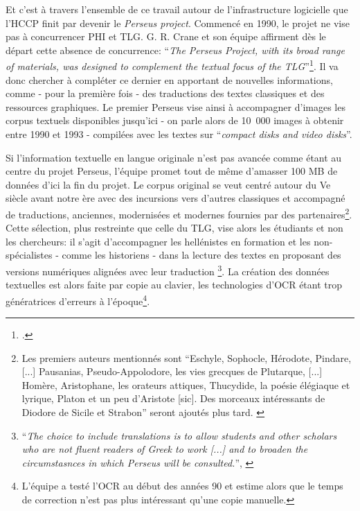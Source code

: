 Et c'est à travers l'ensemble de ce travail autour de l'infrastructure logicielle que l'HCCP finit par devenir le \textit{Perseus project}. Commencé en 1990, le projet ne vise pas à concurrencer PHI et TLG. G. R. Crane et son équipe affirment dès le départ cette absence de concurrence: \enquote{\textit{The Perseus Project, with its broad range of materials, was designed to complement the textual focus of the TLG}}\footcite[p. 134]{mylonas_perseus_1993}. Il va donc chercher à compléter ce dernier en apportant de nouvelles informations, comme - pour la première fois - des traductions des textes classiques et des ressources graphiques. Le premier Perseus vise ainsi à accompagner d'images les corpus textuels disponibles jusqu'ici - on parle alors de 10~000 images à obtenir entre 1990 et 1993 - compilées avec les textes sur \enquote{\textit{compact disks and video disks}}.

Si l'information textuelle en langue originale n'est pas avancée comme étant au centre du projet Perseus, l'équipe promet tout de même d'amasser 100 MB de données d'ici la fin du projet. Le corpus original se veut centré autour du Ve siècle avant notre ère avec des incursions vers d'autres classiques et accompagné de traductions, anciennes, modernisées et modernes fournies par des partenaires\footnote{Les premiers auteurs mentionnés sont \enquote{Eschyle, Sophocle, Hérodote, Pindare, {[...]} Pausanias, Pseudo-Appolodore, les vies grecques de Plutarque, {[...]} Homère, Aristophane, les orateurs attiques, Thucydide, la poésie élégiaque et lyrique, Platon et un peu d'Aristote {[sic]}. Des morceaux intéressants de Diodore de Sicile et Strabon} seront ajoutés plus tard. \cite{mylonas_perseus_1993}}. Cette sélection, plus restreinte que celle du TLG, vise alors les étudiants et non les chercheurs: il s'agit d'accompagner les hellénistes en formation et les non-spécialistes - comme les historiens - dans la lecture des textes en proposant des versions numériques alignées avec leur traduction \footnote{\enquote{\textit{The choice to include translations is to allow students and other scholars who are not fluent readers of Greek to work {[...]} and to broaden the circumstasnces in which Perseus will be consulted.}}, \cite[p. 136]{mylonas_perseus_1993}}. La création des données textuelles est alors faite par copie au clavier, les technologies d'OCR étant trop génératrices d'erreurs à l'époque\footnote{L'équipe a testé l'OCR au début des années 90 et estime alors que le temps de correction n'est pas plus intéressant qu'une copie manuelle.}.

